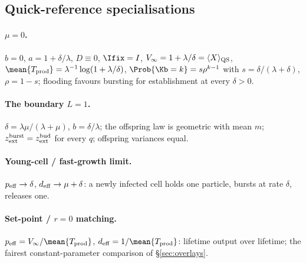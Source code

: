 \subsection*{Quick-reference specialisations}

\paragraph{$\mu=0$.} $b=0$, $a=1+\delta/\lambda$, $D\equiv0$, $\Ifix=I$,
$V_\infty=1+\lambda/\delta=\langle X\rangle_{\rm QS}$,
$\mean{T_{\rm prod}}=\lambda^{-1}\log(1+\lambda/\delta)$,
$\Prob{\Kb=k}=s\rho^{k-1}$ with $s=\delta/(\lambda+\delta)$, $\rho=1-s$;
flooding favours bursting for establishment at every $\delta>0$.

\paragraph{The boundary $L=1$.} $\delta=\lambda\mu/(\lambda+\mu)$,
$b=\delta/\lambda$; the offspring law is geometric with mean $m$;
$z_{\rm ext}^{\rm burst}=z_{\rm ext}^{\rm bud}$ for every $q$; offspring
variances equal.

\paragraph{Young-cell / fast-growth limit.} $p_{\rm eff}\to\delta$,
$d_{\rm eff}\to\mu+\delta$: a newly infected cell holds one particle,
bursts at rate $\delta$, releases one.

\paragraph{Set-point / $r=0$ matching.}
$p_{\rm eff}=V_\infty/\mean{T_{\rm prod}}$,
$d_{\rm eff}=1/\mean{T_{\rm prod}}$: lifetime output over lifetime; the
fairest constant-parameter comparison of \S\ref{sec:overlays}.
